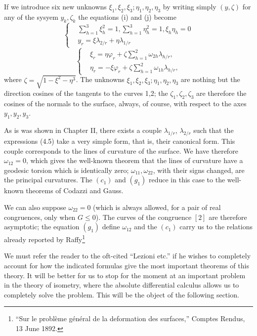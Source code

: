 \documentclass{book}
\begin{document}
If we introduce six new unknowns $\xi_1,\xi_2,\xi_3;\eta_1,\eta_2,\eta_3$ by writing simply $(y,\zeta)$ for any of the sysyem $y_k,\zeta_k$ the equations (i) and (j) become
\begin{equation*}
\tag{$i_1$}
\begin{cases}
&\displaystyle\sum_{h=1}^3\xi_h^2=1,\sum_{h=1}^3\eta_h^2=1,\xi_h\eta_h=0\\
&y_r=\xi\lambda_{2/r}+\eta\lambda_{1/r}
\end{cases}
\end{equation*}
\begin{equation*}
\tag{$j_1$}
\begin{cases}
&\displaystyle\xi_r=\eta\varphi_r+\zeta\sum_{h=1}^2\omega_{2h}\lambda_{h/r},\\
&\displaystyle\eta_r=-\xi\varphi_r+\zeta\sum_{h=1}^2\omega_{1h}\lambda_{h/r},
\end{cases}
\end{equation*}
where $\zeta=\sqrt{1-\xi^2-\eta^3}$.
The unknowns $\xi_1,\xi_2,\xi_3;\eta_1,\eta_2,\eta_3$ are nothing but the direction cosines of the tangents to the curves 1,2; the $\zeta_1,\zeta_2,\zeta_3$ are therefore the cosines of the normals to the surface, always, of course, with respect to the axes $y_1,y_2,y_3$. 

As is was shown in Chapter II, there exists a couple $\lambda_{1/r}$, $\lambda_{2/r}$ such that the expressions (4.5) take a very simple form, that is, their canonical form. This couple corresponds to the lines of curvature of the surface. We have therefore $\omega_{12}=0$, which gives the well-known theorem that the lines of curvature have a geodesic torsion which is identically zero; $\omega_{11},\omega_{22}$, with their signs changed, are the principal curvatures. The $(c_1)$ and $(g_1)$ reduce in this case to the well-known theorems of Codazzi and Gauss. 

We can also suppose $\omega_{22}=0$ (which is always allowed, for a pair of real congruences, only when $G\leq0$). The curves of the congruence $[2]$ are therefore asymptotic; the equation $(g_1)$ define $\omega_{12}$ and the $(c_1)$ carry us to the relations already reported by Raffy\footnote{``Sur le probl\`eme g\'en\'eral de la deformation des surfaces,'' Comptes Rendus, 13 June 1892.}

We must refer the reader to the oft-cited ``Lezioni etc.'' if he wishes to completely account for how the indicated formulas give the most important theorems of this theory. It will be better for us to stop for the moment at an important problem in the theory of isometry, where the absolute differential calculus allows us to completely solve the problem. This will be the object of the following section. 
\end{document}
